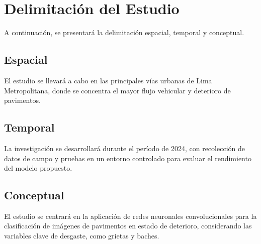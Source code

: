 	\section{Delimitación del Estudio}
	A continuación, se presentará la delimitación espacial, temporal y conceptual.

	\subsection{Espacial}
	El estudio se llevará a cabo en las principales vías urbanas de Lima Metropolitana, donde se concentra el mayor flujo vehicular y deterioro de pavimentos.
	\subsection{Temporal}
	La investigación se desarrollará durante el período de 2024, con recolección de datos de campo y pruebas en un entorno controlado para evaluar el rendimiento del modelo propuesto.
	\subsection{Conceptual}
	El estudio se centrará en la aplicación de redes neuronales convolucionales para la clasificación de imágenes de pavimentos en estado de deterioro, considerando las variables clave de desgaste, como grietas y baches.
